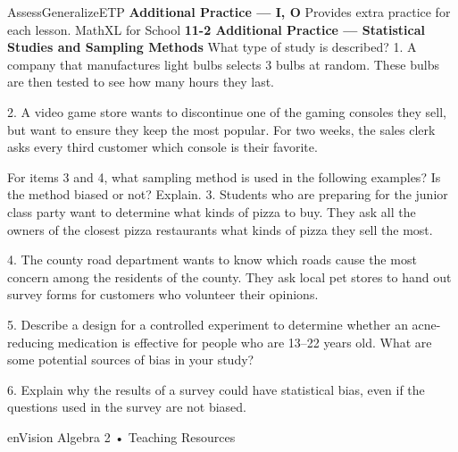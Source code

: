 \documentclass{article}
\newenvironment{te-addendum}[2]{}{}     %
\newcommand{\answer}[1]{}               %
\begin{document}
\begin{te-addendum}{Assess}{GeneralizeETP}
\textbf{Additional Practice — I, O}
Provides extra practice for each lesson.
MathXL for School
\textbf{11-2 Additional Practice — Statistical Studies and Sampling Methods}
What type of study is described?
1. A company that manufactures light bulbs selects 3 bulbs at random. These bulbs are then tested to see how many hours they last.
\answer{observational}
2. A video game store wants to discontinue one of the gaming consoles they sell, but want to ensure they keep the most popular. For two weeks, the sales clerk asks every third customer which console is their favorite.
\answer{sample survey}
For items 3 and 4, what sampling method is used in the following examples? Is the method biased or not? Explain.
3. Students who are preparing for the junior class party want to determine what kinds of pizza to buy. They ask all the owners of the closest pizza restaurants what kinds of pizza they sell the most.
\answer{convenience; Biased; the restaurant sells to people other than students.}
4. The county road department wants to know which roads cause the most concern among the residents of the county. They ask local pet stores to hand out survey forms for customers who volunteer their opinions.
\answer{self-selected; Biased; the patrons are not representative of the entire county.}
5. Describe a design for a controlled experiment to determine whether an acne-reducing medication is effective for people who are 13–22 years old. What are some potential sources of bias in your study?
\answer{Sample: For 100 people who are 13–22 years old, create two groups. One group gets the medication, and one gets a placebo. Over time, assess the degree of acne reduction. Possible biases include false reporting of results or errors in using the medication.}
6. Explain why the results of a survey could have statistical bias, even if the questions used in the survey are not biased.
\answer{Sample: The sample might be too small to accurately reflect the population or the sampling method could be biased.}
enVision Algebra 2 • Teaching Resources
\end{te-addendum}
\end{document}

